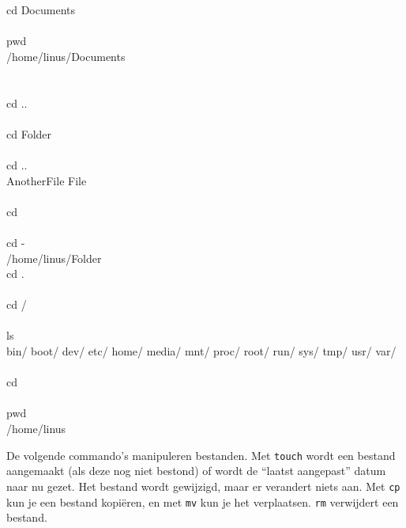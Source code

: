 \begin{bash}
\userprompt cd Documents\\
\  \\
 pwd\\
/home/linus/Documents\\\\
\  \\
 cd ..\\
\  \\
\userprompt cd Folder\\
\  \\
 cd ..\\
AnotherFile  File\\
\  \\
 cd \asciitilde\\
\  \\
\userprompt cd -\\
/home/linus/Folder
\  \\
 cd .\\
\  \\
 cd /\\
\  \\
\userprompt[/] ls\\
bin/  boot/  dev/  etc/  home/  media/  mnt/  proc/  root/  run/  sys/  tmp/  usr/  var/\\
\  \\
\userprompt[/] cd\\
\  \\
\userprompt pwd\\
/home/linus\\
\end{bash}

De volgende commando's manipuleren bestanden. Met \texttt{touch} wordt een bestand aangemaakt (als deze nog niet bestond) of wordt de ``laatst aangepast'' datum naar nu gezet. Het bestand wordt gewijzigd, maar er verandert niets aan. Met \texttt{cp} kun je een bestand kopiëren, en met \texttt{mv} kun je het verplaatsen. \texttt{rm} verwijdert een bestand.

